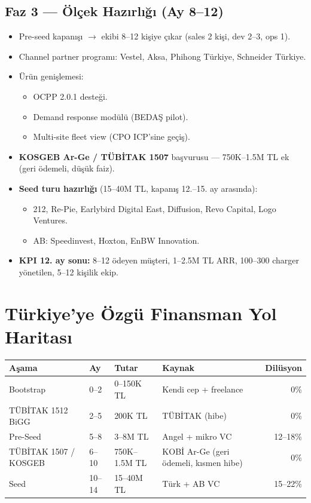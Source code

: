 \documentclass[11pt,a4paper]{article}
\begin{document}
\subsection{Faz 3 --- Ölçek Hazırlığı (Ay 8--12)}
\begin{itemize}
    \item Pre-seed kapanışı $\rightarrow$ ekibi 8--12 kişiye çıkar (sales 2 kişi, dev 2--3, ops 1).
    \item Channel partner programı: Vestel, Aksa, Phihong Türkiye, Schneider Türkiye.
    \item Ürün genişlemesi:
        \begin{itemize}
            \item OCPP 2.0.1 desteği.
            \item Demand response modülü (BEDAŞ pilot).
            \item Multi-site fleet view (CPO ICP'sine geçiş).
        \end{itemize}
    \item \textbf{KOSGEB Ar-Ge / TÜBİTAK 1507} başvurusu --- 750K--1.5M TL ek (geri ödemeli, düşük faiz).
    \item \textbf{Seed turu hazırlığı} (15--40M TL, kapanış 12.--15. ay arasında):
        \begin{itemize}
            \item 212, Re-Pie, Earlybird Digital East, Diffusion, Revo Capital, Logo Ventures.
            \item AB: Speedinvest, Hoxton, EnBW Innovation.
        \end{itemize}
    \item \textbf{KPI 12. ay sonu:} 8--12 ödeyen müşteri, 1--2.5M TL ARR, 100--300 charger yönetilen, 5--12 kişilik ekip.
\end{itemize}

\section{Türkiye'ye Özgü Finansman Yol Haritası}

\begin{tabularx}{\textwidth}{l l l X r}
\toprule
\textbf{Aşama} & \textbf{Ay} & \textbf{Tutar} & \textbf{Kaynak} & \textbf{Dilüsyon} \\
\midrule
Bootstrap & 0--2 & 0--150K TL & Kendi cep + freelance & 0\% \\
TÜBİTAK 1512 BiGG & 2--5 & 200K TL & TÜBİTAK (hibe) & 0\% \\
Pre-Seed & 5--8 & 3--8M TL & Angel + mikro VC & 12--18\% \\
TÜBİTAK 1507 / KOSGEB & 6--10 & 750K--1.5M TL & KOBİ Ar-Ge (geri ödemeli, kısmen hibe) & 0\% \\
Seed & 10--14 & 15--40M TL & Türk + AB VC & 15--22\% \\
\bottomrule
\end{tabularx}
\end{document}
